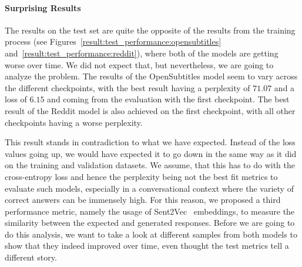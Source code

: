 \paragraph{Surprising Results} The results on the test set are quite the opposite of the results from the training process (see Figures~\ref{result:test_performance:opensubtitles} and~\ref{result:test_performance:reddit}), where both of the models are getting worse over time. We did not expect that, but nevertheless, we are going to analyze the problem. The results of the OpenSubtitles model seem to vary across the different checkpoints, with the best result having a perplexity of $71.07$ and a loss of $6.15$ and coming from the evaluation with the first checkpoint. The best result of the Reddit model is also achieved on the first checkpoint, with all other checkpoints having a worse perplexity.

This result stands in contradiction to what we have expected. Instead of the loss values going up, we would have expected it to go down in the same way as it did on the training and validation datasets. We assume, that this has to do with the cross-entropy loss and hence the perplexity being not the best fit metrics to evaluate such models, especially in a conversational context where the variety of correct answers can be immensely high. For this reason, we proposed a third performance metric, namely the usage of Sent2Vec~\cite{Pgj:2017} embeddings, to measure the similarity between the expected and generated responses. Before we are going to do this analysis, we want to take a look at different samples from both models to show that they indeed improved over time, even thought the test metrics tell a different story.

